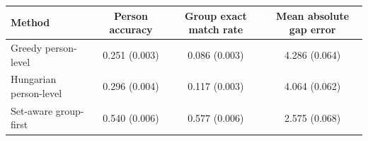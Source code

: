 \begin{tabular}{lccc}
\toprule
Method & Person accuracy & Group exact match rate & Mean absolute gap error \\
\midrule
Greedy person-level & 0.251 (0.003) & 0.086 (0.003) & 4.286 (0.064) \\
Hungarian person-level & 0.296 (0.004) & 0.117 (0.003) & 4.064 (0.062) \\
Set-aware group-first & 0.540 (0.006) & 0.577 (0.006) & 2.575 (0.068) \\
\bottomrule
\end{tabular}
